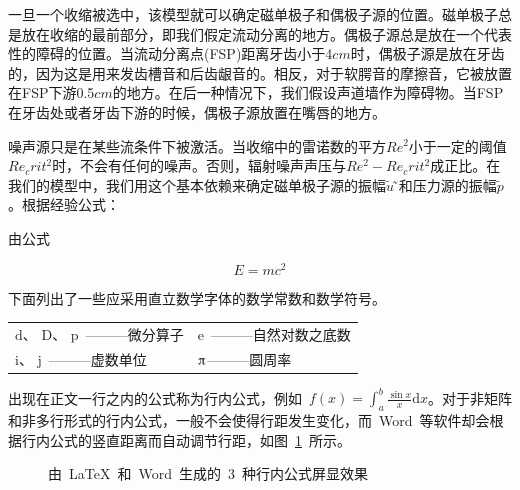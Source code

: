 一旦一个收缩被选中，该模型就可以确定磁单极子和偶极子源的位置。磁单极子总是放在收缩的最前部分，即我们假定流动分离的地方。偶极子源总是放在一个代表性的障碍的位置。当流动分离点(FSP)距离牙齿小于4$cm$时，偶极子源是放在牙齿的，因为这是用来发齿槽音和后齿龈音的。相反，对于软腭音的摩擦音，它被放置在FSP下游0.5$cm$的地方。在后一种情况下，我们假设声道墙作为障碍物。当FSP在牙齿处或者牙齿下游的时候，偶极子源放置在嘴唇的地方。


噪声源只是在某些流条件下被激活。当收缩中的雷诺数的平方$Re^2$小于一定的阈值$Re_crit^2 $时，不会有任何的噪声。否则，辐射噪声声压与$Re^2-Re_crit^2$成正比。在我们的模型中，我们用这个基本依赖来确定磁单极子源的振幅$\tilde{u}$ ̃和压力源的振幅$\tilde{p}$。根据经验公式：









由公式

\[E = mc^2\]

\noindent 下面列出了一些应采用直立数学字体的数学常数和数学符号。

\vspace{-0.5em}
\begin{center}
\begin{tabularx}{0.7\textwidth}{XX}
$\mathrm{d}$、 $\mathrm{D}$、 $\mathrm{p}$~———微分算子 & $\mathrm{e}$~———自然对数之底数 \\
$\mathrm{i}$、 $\mathrm{j}$~———虚数单位 & $\piup$———圆周率\\
\end{tabularx}
\end{center}


出现在正文一行之内的公式称为行内公式，例如~$f(x)=\int_{a}^{b}\frac{\sin{x}}{x}\mathrm{d}x$。对于非矩阵和非多行形式的行内公式，一般不会使得行距发生变化，而~Word~等软件却会根据行内公式的竖直距离而自动调节行距，如图~\ref{fig:hangju}~所示。

\begin{figure}[htbp]
\centering
{}

\caption{由~\LaTeX~和~Word~生成的~3~种行内公式屏显效果}\label{fig:hangju}
\vspace{-1em}
\end{figure}

